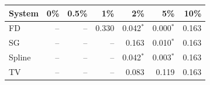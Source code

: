 \begin{tabular}{lrrrrrr}\toprule
System & 0\% & 0.5\% & 1\% & 2\% & 5\% & 10\% \\\midrule
FD & -- & -- & 0.330 & 0.042$^*$ & 0.000$^*$ & 0.163 \\
SG & -- & -- & -- & 0.163 & 0.010$^*$ & 0.163 \\
Spline & -- & -- & -- & 0.042$^*$ & 0.003$^*$ & 0.163 \\
TV & -- & -- & -- & 0.083 & 0.119 & 0.163 \\
\bottomrule\end{tabular}
